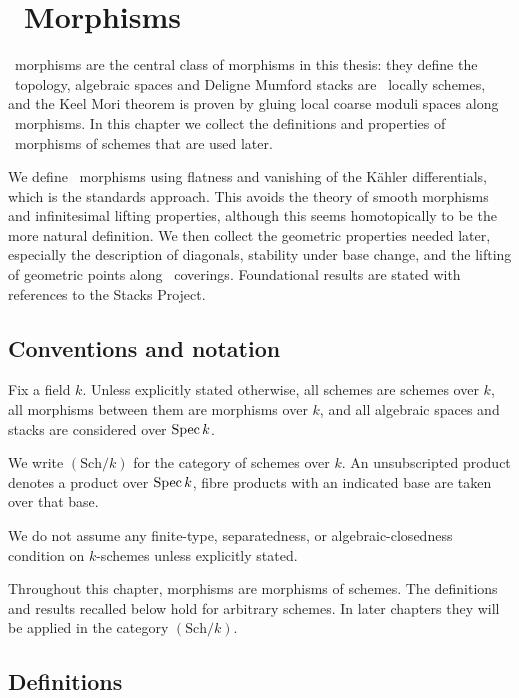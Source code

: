 \chapter{\Etale\ Morphisms}\label{ch:etale-morphisms}

\Etale\ morphisms are the central class of morphisms in this thesis: they define the \etale\ topology, algebraic spaces and Deligne Mumford stacks are \etale\ locally schemes, and the Keel Mori theorem is proven by gluing local coarse moduli spaces along \etale\ morphisms.
In this chapter we collect the definitions and properties of \etale\ morphisms of schemes that are used later.

We define \etale\ morphisms using flatness and vanishing
of the K\"ahler differentials, which is the standards approach. This avoids the theory of smooth morphisms and infinitesimal lifting properties, although this seems homotopically to be the more natural definition. We then collect
the geometric properties needed later, especially the
description of diagonals, stability under base change, and
the lifting of geometric points along \etale\ coverings.
Foundational results are stated with references to the
Stacks Project.


\section{Conventions and notation}

Fix a field $k$. Unless explicitly stated otherwise, all
schemes are schemes over $k$, all morphisms between them are morphisms over $k$, and all algebraic spaces and stacks are considered over $\operatorname{Spec}{k}$.

We write $(\mathrm{Sch}/k)$ for the category of schemes over $k$. An unsubscripted product denotes a product over $\operatorname{Spec}{k}$, fibre products with an indicated base are taken over that base.

We do not assume any finite-type, separatedness, or algebraic-closedness
condition on $k$-schemes unless explicitly stated.

Throughout this chapter, morphisms are morphisms of schemes. The definitions and results recalled below hold for arbitrary schemes. In later chapters they will be applied in the category $(\mathrm{Sch}/k)$.

\section{Definitions}


